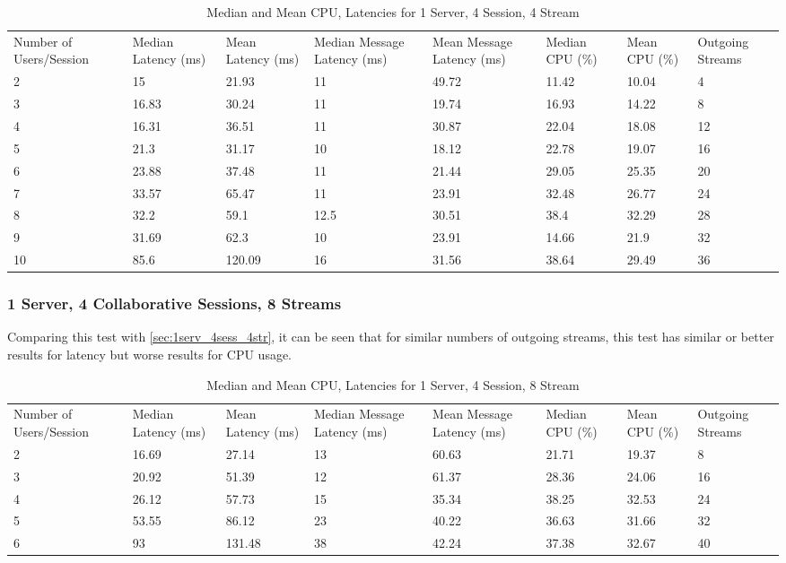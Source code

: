 \begin{table}
\caption{Median and Mean CPU, Latencies for 1 Server, 4 Session, 4 Stream}
\label{table:1serv_4sess_4str}
\begin{tabu} to\linewidth{|X[c]|X[c]|X[c]|X[c]|X[c]|X[c]|X[c]|X[c]|}
\everyrow{\hline}
\hline
Number of Users/Session & Median Latency (ms) & Mean Latency (ms) & Median Message Latency (ms) & Mean Message Latency (ms) & Median CPU (\%) & Mean CPU (\%) & Outgoing Streams\\
2 & 15 & 21.93 & 11 & 49.72 & 11.42 & 10.04 & 4 \\
3 & 16.83 & 30.24 & 11 & 19.74 & 16.93 & 14.22 & 8 \\
4 & 16.31 & 36.51 & 11 & 30.87 & 22.04 & 18.08 & 12 \\
5 & 21.3 & 31.17 & 10 & 18.12 & 22.78 & 19.07 & 16 \\
6 & 23.88 & 37.48 & 11 & 21.44 & 29.05 & 25.35 & 20 \\
7 & 33.57 & 65.47 & 11 & 23.91 & 32.48 & 26.77 & 24 \\
8 & 32.2 & 59.1 & 12.5 & 30.51 & 38.4 & 32.29 & 28 \\
9 & 31.69 & 62.3 & 10 & 23.91 & 14.66 & 21.9 & 32 \\
10 & 85.6 & 120.09 & 16 & 31.56 & 38.64 & 29.49 & 36 \\
\end{tabu}
\end{table}

\clearpage\subsubsection{1 Server, 4 Collaborative Sessions, 8 Streams}
\label{sec:1serv_4sess_8sstr}

Comparing this test with \ref{sec:1serv_4sess_4str}, it can be seen that for similar numbers of outgoing streams, this test has similar or better results for latency but worse results for CPU usage.

\begin{table}
\caption{Median and Mean CPU, Latencies for 1 Server, 4 Session, 8 Stream}
\label{table:1serv_4sess_8str}
\begin{tabu} to\linewidth{|X[c]|X[c]|X[c]|X[c]|X[c]|X[c]|X[c]|X[c]|}
\everyrow{\hline}
\hline
Number of Users/Session & Median Latency (ms) & Mean Latency (ms) & Median Message Latency (ms) & Mean Message Latency (ms) & Median CPU (\%) & Mean CPU (\%) & Outgoing Streams\\
2 & 16.69 & 27.14 & 13 & 60.63 & 21.71 & 19.37 & 8 \\
3 & 20.92 & 51.39 & 12 & 61.37 & 28.36 & 24.06 & 16 \\
4 & 26.12 & 57.73 & 15 & 35.34 & 38.25 & 32.53 & 24 \\
5 & 53.55 & 86.12 & 23 & 40.22 & 36.63 & 31.66 & 32 \\
6 & 93 & 131.48 & 38 & 42.24 & 37.38 & 32.67 & 40 \\
\end{tabu}
\end{table}

